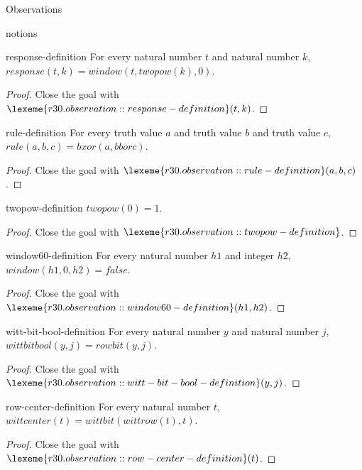 \begin{lexlean}{Observations}
\begin{section}{notions}
\begin{lemma}{response-definition}
For every natural number \(t\) and natural number \(k\), \(response(t, k) = window(t, twopow(k), 0)\).
\begin{proof}
Close the goal with \(\lexeme{r30.observation::response-definition}(t, k)\).
\end{proof}
\end{lemma}

\begin{lemma}{rule-definition}
For every truth value \(a\) and truth value \(b\) and truth value \(c\), \(rule(a, b, c) = bxor(a, b bor c)\).
\begin{proof}
Close the goal with \(\lexeme{r30.observation::rule-definition}(a, b, c)\).
\end{proof}
\end{lemma}

\begin{lemma}{twopow-definition}
\(twopow(0) = 1\).
\begin{proof}
Close the goal with \(\lexeme{r30.observation::twopow-definition}\).
\end{proof}
\end{lemma}

\begin{lemma}{window60-definition}
For every natural number \(h1\) and integer \(h2\), \(window(h1, 0, h2) = false\).
\begin{proof}
Close the goal with \(\lexeme{r30.observation::window60-definition}(h1, h2)\).
\end{proof}
\end{lemma}

\begin{lemma}{witt-bit-bool-definition}
For every natural number \(y\) and natural number \(j\), \(wittbitbool(y, j) = rowbit(y, j)\).
\begin{proof}
Close the goal with \(\lexeme{r30.observation::witt-bit-bool-definition}(y, j)\).
\end{proof}
\end{lemma}

\begin{lemma}{row-center-definition}
For every natural number \(t\), \(wittcenter(t) = wittbit(wittrow(t), t)\).
\begin{proof}
Close the goal with \(\lexeme{r30.observation::row-center-definition}(t)\).
\end{proof}
\end{lemma}


\end{section}
\end{lexlean}

